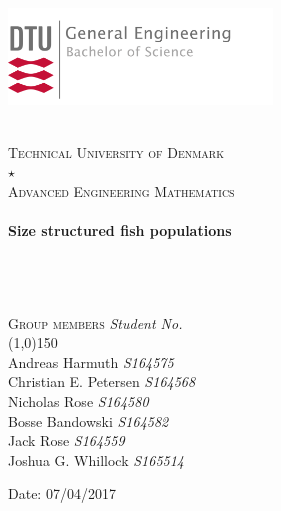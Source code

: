 \documentclass{article}
\numberwithin{equation}{section} %
\newcommand{\mystar}{{\fontfamily{lmr}\selectfont$\star$}}
\begin{document}

\begin{titlepage}
	\begin{flushleft}
	\vspace*{-3.5cm}
	\hspace*{-3 cm}
		\includegraphics[width=7cm]{pictures/Logo.png} %
	\end{flushleft}
	\begin{center}
	\\
	[2cm]
	\textsc{\large 	Technical University of Denmark}\\
	[0.5cm]
	\textsc{\LARGE \mystar} \\
	[0.5cm]
	\textsc{\LARGE Advanced Engineering Mathematics}\\
	[2cm]
	\noindent\makebox[\linewidth]{\rule{\paperwidth}{1.5 pt}}\\
	[5mm]
	\huge{\bfseries Size structured fish populations} \\
	[0.2 cm]

	\noindent\makebox[\linewidth]{\rule{\paperwidth}{1.5 pt}}\\
	[-0.75 cm]
	\noindent\makebox[\linewidth]{\rule{\paperwidth}{0.5 pt}}\\

	\textsc{\Large}\\
	[3.5cm]
		
	\end{center}
	\begin{flushright}
	\textsc{\large Group members} \textit{Student No.}\\ 
	\line(1,0){150}\\
	Andreas Harmuth \textit{S164575} \\
	Christian E. Petersen \textit{S164568}\\
	Nicholas Rose \textit{S164580}\\
	Bosse Bandowski \textit{S164582}\\
	Jack Rose \textit{S164559}\\
	Joshua G. Whillock \textit{S165514}\\
	[1.5cm]
	\end{flushright}
	
	\begin{center}
		Date: 07/04/2017
	\end{center}
\end{titlepage}
\end{document}
